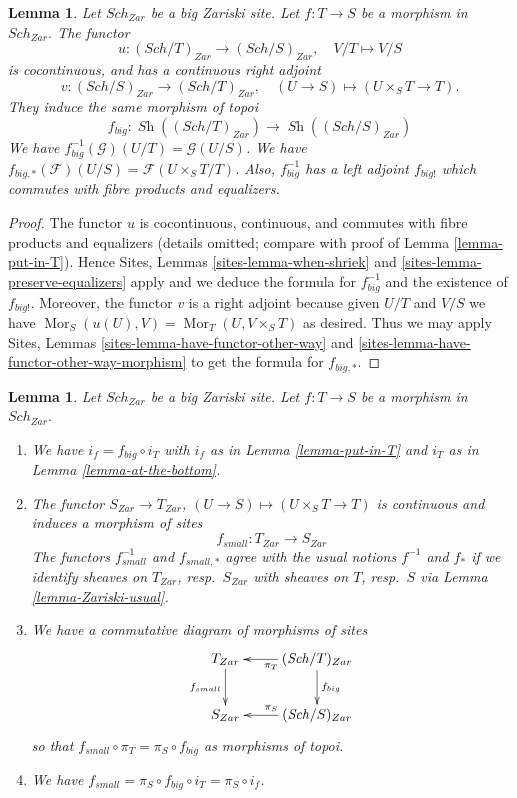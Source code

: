 \documentclass{stacks-project}
\theoremstyle{plain}
\newtheorem{lemma}[subsection]{Lemma}
\theoremstyle{definition}
\theoremstyle{remark}
\numberwithin{equation}{subsection}
\def\Sch{\mathit{Sch}}
\def\Mor{\mathop{\mathrm{Mor}}\nolimits}
\def\Sh{\mathop{\mathit{Sh}}\nolimits}
\begin{document}
\begin{lemma}
\label{lemma-morphism-big}
Let $\Sch_{Zar}$ be a big Zariski site.
Let $f : T \to S$ be a morphism in $\Sch_{Zar}$.
The functor
$$
u : (\Sch/T)_{Zar} \longrightarrow (\Sch/S)_{Zar},
\quad
V/T \longmapsto V/S
$$
is cocontinuous, and has a continuous right adjoint
$$
v : (\Sch/S)_{Zar} \longrightarrow (\Sch/T)_{Zar},
\quad
(U \to S) \longmapsto (U \times_S T \to T).
$$
They induce the same morphism of topoi
$$
f_{big} :
\Sh((\Sch/T)_{Zar})
\longrightarrow
\Sh((\Sch/S)_{Zar})
$$
We have $f_{big}^{-1}(\mathcal{G})(U/T) = \mathcal{G}(U/S)$.
We have $f_{big, *}(\mathcal{F})(U/S) = \mathcal{F}(U \times_S T/T)$.
Also, $f_{big}^{-1}$ has a left adjoint $f_{big!}$ which commutes with
fibre products and equalizers.
\end{lemma}

\begin{proof}
The functor $u$ is cocontinuous, continuous, and commutes with fibre products
and equalizers (details omitted; compare with proof of
Lemma \ref{lemma-put-in-T}).
Hence
Sites, Lemmas \ref{sites-lemma-when-shriek} and
\ref{sites-lemma-preserve-equalizers}
apply and we deduce the formula
for $f_{big}^{-1}$ and the existence of $f_{big!}$. Moreover,
the functor $v$ is a right adjoint because given $U/T$ and $V/S$
we have $\Mor_S(u(U), V) = \Mor_T(U, V \times_S T)$
as desired. Thus we may apply
Sites, Lemmas \ref{sites-lemma-have-functor-other-way} and
\ref{sites-lemma-have-functor-other-way-morphism}
to get the formula for $f_{big, *}$.
\end{proof}

\begin{lemma}
\label{lemma-morphism-big-small}
Let $\Sch_{Zar}$ be a big Zariski site.
Let $f : T \to S$ be a morphism in $\Sch_{Zar}$.
\begin{enumerate}
\item We have $i_f = f_{big} \circ i_T$ with $i_f$ as in
Lemma \ref{lemma-put-in-T} and $i_T$ as in
Lemma \ref{lemma-at-the-bottom}.
\item The functor $S_{Zar} \to T_{Zar}$,
$(U \to S) \mapsto (U \times_S T \to T)$ is continuous and induces
a morphism of sites
$$
f_{small} :
T_{Zar}
\longrightarrow
S_{Zar}
$$
The functors $f_{small}^{-1}$ and $f_{small, *}$ agree with
the usual notions $f^{-1}$ and $f_*$ if we identify sheaves
on $T_{Zar}$, resp.\ $S_{Zar}$ with sheaves on $T$, resp.\ $S$
via Lemma \ref{lemma-Zariski-usual}.
\item We have a commutative diagram of morphisms of sites
$$
\xymatrix{
T_{Zar} \ar[d]_{f_{small}} &
(\Sch/T)_{Zar} \ar[d]^{f_{big}} \ar[l]^{\pi_T} \\
S_{Zar} &
(\Sch/S)_{Zar} \ar[l]_{\pi_S}
}
$$
so that $f_{small} \circ \pi_T = \pi_S \circ f_{big}$ as morphisms of topoi.
\item We have $f_{small} = \pi_S \circ f_{big} \circ i_T = \pi_S \circ i_f$.
\end{enumerate}
\end{lemma}
\end{document}
